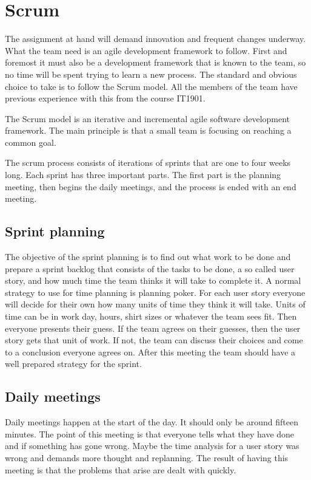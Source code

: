 \section{Scrum}

The assignment at hand will demand innovation and frequent changes underway.
What the team need is an agile development framework to follow. First and foremost it must also be a development framework that is known to the team,
so no time will be spent trying to learn a new process.
The standard and obvious choice to take is to follow the Scrum model. All the members of the team have previous experience with this from the course IT1901.

The Scrum model is an iterative and incremental agile software development framework.
The main principle is that a small team is focusing on reaching a common goal.

The scrum process consists of iterations of sprints that are one to four weeks long. Each sprint has three important parts.
The first part is the planning meeting, then begins the daily  meetings, and the process is ended with an end meeting.

\subsection{Sprint planning}
The objective of the sprint planning is to find out what work to be done and prepare a
sprint backlog that consists of the tasks to be done, a so called user story, and how much time the team thinks it will take to complete it. A normal strategy to use for time planning is
planning poker. For each user story everyone will decide for their own how many units of time they think it will take. Units of time can be in work day, hours, shirt sizes or whatever the team sees fit.
Then everyone presents their guess. If the team agrees on their guesses, then the user story gets that unit of work. If not, the team can discuss their choices and come to a conclusion everyone agrees on.
After this meeting the team should have a well prepared strategy for the sprint.

\subsection{Daily meetings}
Daily meetings happen at the start of the day. It should only be around fifteen minutes. The point of this meeting is that everyone tells what they have done and if something has gone wrong.
Maybe the time analysis for a user story was wrong and demands more thought and replanning. The result of having this meeting is that the problems that arise are dealt with quickly.

